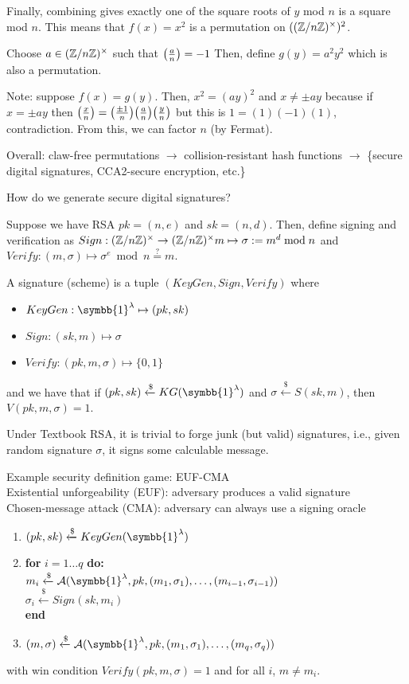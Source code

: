 \documentclass[notes]{agony}
\newcommand{\xgets}{\xleftarrow}
\newcommand{\ndgets}{\xgets{\mathdollar}}
\newcommand{\one}{\symbb{1}}
\newcommand{\leg}[2]{\qty(\frac{#1}{#2})}
\newcommand{\mgrp}[1]{(\Z/#1\Z)^\times}
\begin{document}
Finally, combining gives exactly one of the square roots of $y$ mod $n$
is a square mod $n$.
This means that $f(x) = x^2$ is a permutation on $(\mgrp n)^2$.

Choose $a \in \mgrp n$ such that $\leg{a}{n}=-1$
Then, define $g(y) = a^2 y^2$ which is also a permutation.

Note: suppose $f(x) = g(y)$.
Then, $x^2 = (ay)^2$ and $x \neq \pm ay$
because if $x = \pm ay$ then $\leg{x}{n} = \leg{\pm 1}{n}\leg{a}{n}\leg{y}{n}$
but this is $1 = (1)(-1)(1)$, contradiction.
From this, we can factor $n$ (by Fermat).

Overall: claw-free permutations $\to$ collision-resistant hash functions
$\to$ \{secure digital signatures, CCA2-secure encryption, etc.\}

How do we generate secure digital signatures?

Suppose we have RSA $pk = (n,e)$ and $sk = (n,d)$.
Then, define signing and verification as
$Sign : \mgrp{n} \to \mgrp{n} m \mapsto \sigma := m^d \bmod n$
and $Verify : (m,\sigma) \mapsto \sigma^e \bmod n \stackrel{?}{=} m$.

\begin{defn}
  A signature (scheme) is a tuple $(KeyGen, Sign, Verify)$ where
  \begin{itemize}[nosep]
    \item $KeyGen : \one^\lambda \mapsto (pk, sk)$
    \item $Sign : (sk, m) \mapsto \sigma$
    \item $Verify : (pk, m, \sigma) \mapsto \{0,1\}$
  \end{itemize}
  and we have that if $(pk, sk) \ndgets KG(\one^\lambda)$
  and $\sigma \ndgets S(sk,m)$, then $V(pk, m, \sigma) = 1$.
\end{defn}

Under Textbook RSA, it is trivial to forge junk (but valid) signatures,
i.e., given random signature $\sigma$, it signs some calculable message.

Example security definition game: EUF-CMA \\
Existential unforgeability (EUF): adversary produces a valid signature \\
Chosen-message attack (CMA): adversary can always use a signing oracle
\begin{enumerate}[1., nosep]
  \item $(pk, sk) \ndgets KeyGen(\one^\lambda)$
  \item \textbf{for} $i=1\dots q$ \textbf{do:} \\
        \hspace*{1cm} $m_i \ndgets \mathcal A(\one^\lambda, pk, (m_1,\sigma_1),\dotsc,(m_{i-1},\sigma_{i-1}))$ \\
        \hspace*{1cm} $\sigma_i \ndgets Sign(sk, m_i)$ \\
        \textbf{end}
  \item $(m,\sigma) \ndgets \mathcal A(\one^\lambda, pk, (m_1,\sigma_1),\dotsc,(m_q,\sigma_q))$
\end{enumerate}
with win condition $Verify(pk,m,\sigma)=1$ and for all $i$, $m \neq m_i$.
\end{document}
